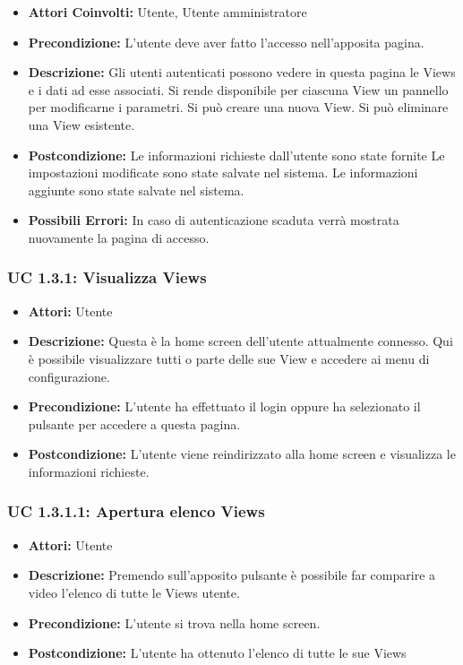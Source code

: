 \begin{itemize}
    \item \textbf{Attori Coinvolti:} Utente, Utente amministratore
    \item \textbf{Precondizione:} L’utente deve aver fatto l’accesso nell’apposita pagina.

    \item \textbf{Descrizione:} Gli utenti autenticati possono vedere in questa pagina le Views e i dati ad esse associati.
    Si rende disponibile per ciascuna View un pannello per modificarne i parametri.
    Si può creare una nuova View.
    Si può eliminare una View esistente.

    \item \textbf{Postcondizione:}
    Le informazioni richieste dall'utente sono state fornite
    Le impostazioni modificate sono state salvate nel sistema.
    Le informazioni aggiunte sono state salvate nel sistema.

    \item \textbf{Possibili Errori:}
    In caso di autenticazione scaduta verrà mostrata nuovamente la pagina di accesso.
\end{itemize}

\subsubsection{UC 1.3.1: Visualizza Views}

\begin{itemize}
    \item \textbf{Attori:} Utente
    \item \textbf{Descrizione:} Questa è la home screen dell'utente attualmente connesso. Qui è possibile visualizzare tutti o parte delle sue View e accedere ai menu di configurazione.
    \item \textbf{Precondizione:} L'utente ha effettuato il login oppure ha selezionato il pulsante per accedere a questa pagina.
    \item \textbf{Postcondizione:} L'utente viene reindirizzato alla home screen e visualizza le informazioni richieste.
\end{itemize}

\subsubsection{UC 1.3.1.1: Apertura elenco Views}

\begin{itemize}
    \item \textbf{Attori:} Utente
    \item \textbf{Descrizione:} Premendo sull'apposito pulsante è possibile far comparire a video l'elenco di tutte le Views utente.
    \item \textbf{Precondizione:} L'utente si trova nella home screen.
    \item \textbf{Postcondizione:} L'utente ha ottenuto l'elenco di tutte le sue Views
\end{itemize}

